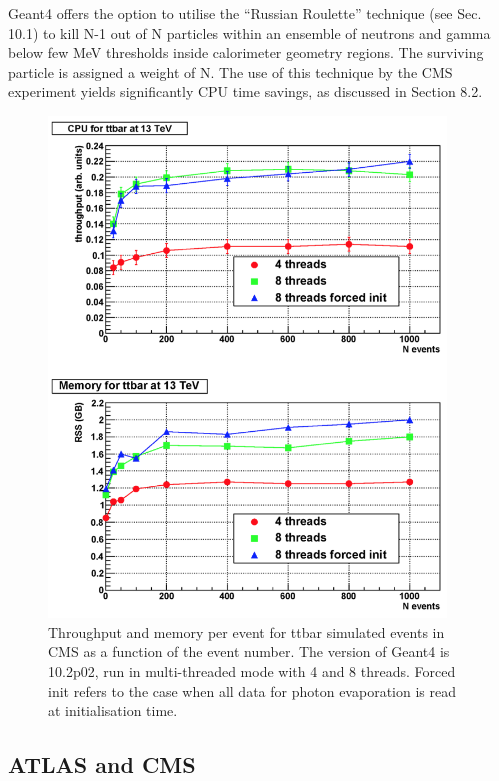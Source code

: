 \documentclass[12pt,a4paper]{article}
\begin{document}
{Geant4 offers the option to utilise the ``Russian Roulette'' technique
(see Sec. 10.1) to kill N-1 out of N particles within an ensemble of
neutrons and gamma below few MeV thresholds inside calorimeter geometry
regions. The surviving particle is assigned a weight of N. The use of
this technique by the CMS experiment yields significantly CPU time
savings, as discussed in Section 8.2.


\begin{figure}[bthp]
\vspace*{0.3cm}
\centering
\includegraphics[width=0.94\textwidth]{image14.png}
\caption{Throughput and memory per event for ttbar simulated
events in CMS as a function of the event number. The version of Geant4
is 10.2p02, run in multi-threaded mode with 4 and 8 threads. Forced init
refers to the case when all data for photon evaporation is read at
initialisation time.}
\label{fig:perfthroughput}
\end{figure}

\hypertarget{ATLAS-and-CMS}{%
\subsection{ATLAS and CMS}\label{ATLAS-and-CMS}}

}
\end{document}
